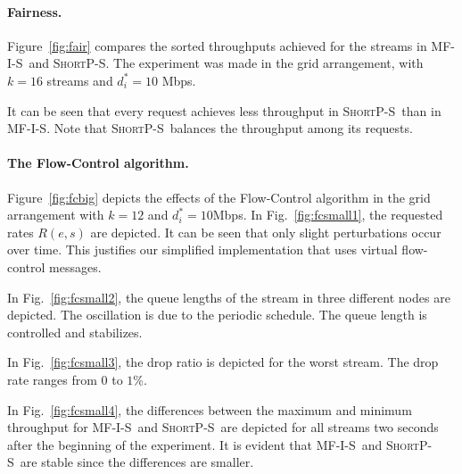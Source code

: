 \documentclass[12pt,oneside,english,a4paper]{book}
\theoremstyle{plain}
\theoremstyle{definition}
\theoremstyle{Theorem}
\theoremstyle{plain}
\newenvironment{proof sketch}[1]{\noindent {\emph{Proof sketch of #1:}}}{\hfill \qed}
\newcommand{\algA}{\textsc{MF-I-S}}
\newcommand{\algBS}{\textsc{ShortP-S}}
\begin{document}
\paragraph{Fairness.}
Figure~\ref{fig:fair} compares the sorted throughputs achieved for the
streams in \algA\ and \algBS.  The experiment was made in the grid
arrangement, with $k=16$ streams and $d^*_i=10$ Mbps.

It can be seen that every request achieves less throughput in \algBS\ than in \algA.
Note that \algBS\ balances the throughput among its requests.

\paragraph{The Flow-Control algorithm.}

Figure~\ref{fig:fcbig} depicts the effects of the Flow-Control
algorithm in the grid arrangement with $k=12$ and $d^*_i=10$Mbps.  In
Fig.~\ref{fig:fcsmall1}, the requested rates $R(e,s)$ are depicted. It
can be seen that only slight perturbations occur over time. This
justifies our simplified implementation that uses virtual flow-control messages.

In Fig.~\ref{fig:fcsmall2}, the queue lengths of the stream in three
different nodes are depicted.  The oscillation is due to the periodic
schedule. The queue length is controlled and stabilizes.

In Fig.~\ref{fig:fcsmall3}, the drop ratio is depicted for the worst
stream. The drop rate ranges from $0$ to $1$\%.

In Fig.~\ref{fig:fcsmall4}, the differences between the maximum and
minimum throughput for \algA\ and \algBS\ are depicted for all streams
two seconds after the beginning of the experiment.
It is evident that \algA\ and \algBS\ are stable since the differences are smaller.

\end{document}
